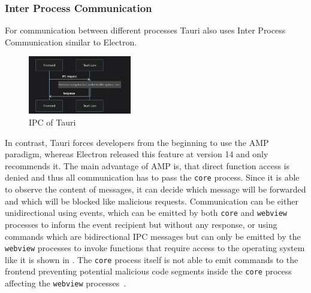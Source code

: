\subsubsection{Inter Process Communication}
For communication between different processes Tauri also uses Inter Process Communication similar to Electron.
\begin{figure}[ht]
    \centering
    \includegraphics[width=0.4\textwidth]{images/TauriIPC}
    \caption{IPC of Tauri~\cite[Figure 1--3]{tauri}}
    \label{fig:tauri:ipc}
\end{figure}
In contrast, Tauri forces developers from the beginning to use the \ac{AMP} paradigm, whereas Electron released this feature at version 14 and only recommends it.
The main advantage of \ac{AMP} is, that direct function access is denied and thus all communication has to pass the \texttt{core} process.
Since it is able to observe the content of messages, it can decide which message will be forwarded and which will be blocked like malicious requests.
Communication can be either unidirectional using events, which can be emitted by both \texttt{core} and \texttt{webview} processes to inform the event recipient but without any response,
or using commands which are bidirectional \ac{IPC} messages but can only be emitted by the \texttt{webview} processes to invoke functions that require access to the operating system like it is shown in .
The \texttt{core} process itself is not able to emit commands to the frontend preventing potential malicious code segments inside the \texttt{core} process affecting the \texttt{webview} processes~\cite{tauri}.

